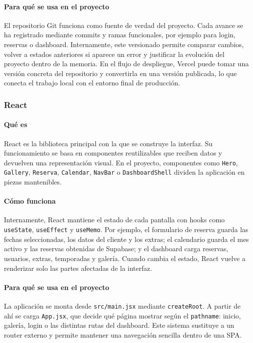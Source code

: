 \documentclass[11pt,a4paper]{article}
\begin{document}
\paragraph{Para qué se usa en el proyecto}
El repositorio Git funciona como fuente de verdad del proyecto. Cada avance se ha registrado mediante commits y ramas funcionales, por ejemplo para login, reservas o dashboard. Internamente, este versionado permite comparar cambios, volver a estados anteriores si aparece un error y justificar la evolución del proyecto dentro de la memoria. En el flujo de despliegue, Vercel puede tomar una versión concreta del repositorio y convertirla en una versión publicada, lo que conecta el trabajo local con el entorno final de producción.

\subsubsection{React}
\paragraph{Qué es}
React es la biblioteca principal con la que se construye la interfaz. Su funcionamiento se basa en componentes reutilizables que reciben datos y devuelven una representación visual. En el proyecto, componentes como \texttt{Hero}, \texttt{Gallery}, \texttt{Reserva}, \texttt{Calendar}, \texttt{NavBar} o \texttt{DashboardShell} dividen la aplicación en piezas mantenibles.

\paragraph{Cómo funciona}
Internamente, React mantiene el estado de cada pantalla con hooks como \texttt{useState}, \texttt{useEffect} y \texttt{useMemo}. Por ejemplo, el formulario de reserva guarda las fechas seleccionadas, los datos del cliente y los extras; el calendario guarda el mes activo y las reservas obtenidas de Supabase; y el dashboard carga reservas, usuarios, extras, temporadas y galería. Cuando cambia el estado, React vuelve a renderizar solo las partes afectadas de la interfaz.

\paragraph{Para qué se usa en el proyecto}
La aplicación se monta desde \texttt{src/main.jsx} mediante \texttt{createRoot}. A partir de ahí se carga \texttt{App.jsx}, que decide qué página mostrar según el \texttt{pathname}: inicio, galería, login o las distintas rutas del dashboard. Este sistema sustituye a un router externo y permite mantener una navegación sencilla dentro de una SPA.
\end{document}
